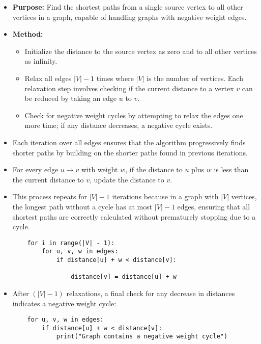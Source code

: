\documentclass[landscape,7pt]{extarticle}
\begin{document}
\begin{multicols*}{3}
\begin{itemize}
    \item \textbf{Purpose:} Find the shortest paths from a single source vertex to all other vertices in a graph, capable of handling graphs with negative weight edges.
    \item \textbf{Method:}
    \begin{itemize}
        \item Initialize the distance to the source vertex as zero and to all other vertices as infinity.
        \item Relax all edges $|V|-1$ times where $|V|$ is the number of vertices. Each relaxation step involves checking if the current distance to a vertex $v$ can be reduced by taking an edge $u$ to $v$.
        \item Check for negative weight cycles by attempting to relax the edges one more time; if any distance decreases, a negative cycle exists.
    \end{itemize}
    \item Each iteration over all edges ensures that the algorithm progressively finds shorter paths by building on the shorter paths found in previous iterations.
    \item For every edge $u \to v$ with weight $w$, if the distance to $u$ plus $w$ is less than the current distance to $v$, update the distance to $v$.
    \item This process repeats for $|V|-1$ iterations because in a graph with $|V|$ vertices, the longest path without a cycle has at most $|V|-1$ edges, ensuring that all shortest paths are correctly calculated without prematurely stopping due to a cycle.
    
    \begin{verbatim}
    for i in range(|V| - 1):
        for u, v, w in edges:
            if distance[u] + w < distance[v]:
                
                distance[v] = distance[u] + w
    \end{verbatim}
    
    \item After $(|V|-1)$ relaxations, a final check for any decrease in distances indicates a negative weight cycle:
    
    \begin{verbatim}
    for u, v, w in edges:
        if distance[u] + w < distance[v]:
            print("Graph contains a negative weight cycle")
    \end{verbatim}
    

\end{itemize}
\end{multicols*}
\end{document}
